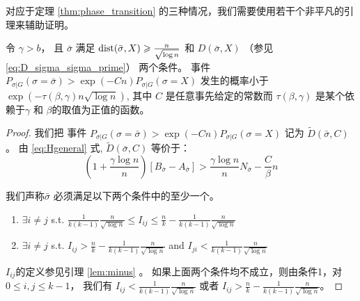   对应于定理 \ref{thm:phase_transition}  的三种情况，我们需要使用若干个非平凡的引理来辅助证明。

  \begin{lemma}\label{lem:sigmaX}
    令 $\gamma > b$， 且 $\bar{\sigma}$ 满足 $\operatorname{dist}(\bar{\sigma}, X) \geqslant \frac{n}{\sqrt{\log n}}$
    和 $D(\bar{\sigma}, X)$
    （参见\eqref{eq:D_sigma_sigma_prime}）
    两个条件。
    事件
    $P_{\sigma | G}(\sigma = \bar{\sigma} ) > \exp(-Cn) P_{\sigma | G}(\sigma = X)$
    发生的概率小于 $\exp(-\tau(\beta, \gamma) n \sqrt{\log  n} )$,
    其中 $C$ 是任意事先给定的常数而 
    $\tau(\beta, \gamma)$
   是某个依赖于$\gamma$ 和 $\beta$的取值为正值的函数。
  \end{lemma}
  \begin{proof}
    我们把 事件 $P_{\sigma | G}(\sigma = \bar{\sigma} ) > \exp(-Cn) P_{\sigma | G}(\sigma = X)$
    记为 $\widetilde{D}(\bar{\sigma}, C)$。
    由 \eqref{eq:Hgeneral} 式, $\widetilde{D}(\bar{\sigma}, C)$
    等价于：
  \begin{equation}\label{eq:BwA}
    (1 + \frac{\gamma \log n}{n})[B_{\bar{\sigma}} - A_{\bar{\sigma}}] >  \frac{\gamma \log n}{n} N_{\bar{\sigma}}  - \frac{C}{\beta} n
    \end{equation}  
    
    我们声称$\bar{\sigma}$  必须满足以下两个条件中的至少一个。
    \begin{enumerate}
      \item $\exists i\neq j$ s.t. $\frac{1}{k(k-1)}\frac{n}{\sqrt{\log n}} \leq I_{ij} \leq \frac{n}{k} - \frac{1}{k(k-1)}\frac{n}{\sqrt{\log n}}$
      \item $\exists i \neq j$ s.t. $I_{ij} > \frac{n}{k} - \frac{1}{k(k-1)}\frac{n}{\sqrt{\log n}}$ and $I_{ji} < \frac{1}{k(k-1)}\frac{n}{\sqrt{\log n}}$
    \end{enumerate}
    $I_{ij}$的定义参见引理
    \ref{lem:minus} 。
    如果上面两个条件均不成立，则由条件1，对 $0 \leq i,j\leq k-1$，
    我们有
    $I_{ij} < \frac{1}{k(k-1)}\frac{n}{\sqrt{\log n}}$
    或者 $I_{ij} > \frac{n}{k} - \frac{1}{k(k-1)}\frac{n}{\sqrt{\log n}}$。
    

\end{proof}
